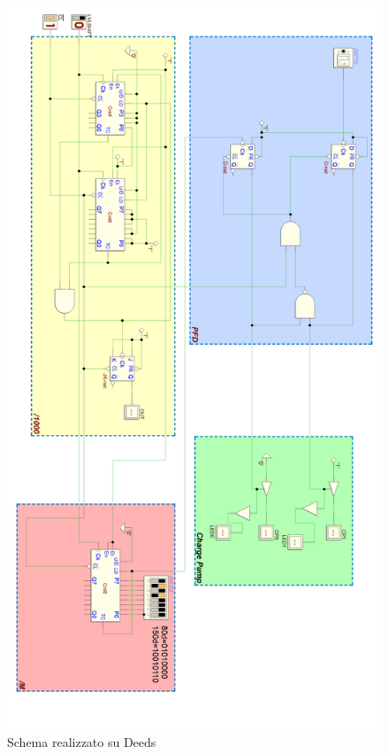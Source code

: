 \documentclass[a4paper]{article}
\begin{document}
~\begin{figure}[H]%
\includegraphics[scale=7]{Fig_Finale.png} 
\centering
\caption{Schema realizzato su Deeds}
\label{fig:foo}
\end{figure}
\newpage
\end{document}
